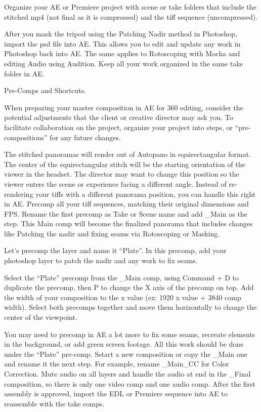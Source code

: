 \begin{fullwidth}
\clearpage
Organize your AE or Premiere project with scene or take folders that include the stitched mp4 (not final as it is compressed) and the tiff sequence (uncompressed). 


After you mask the tripod using the Patching Nadir method in Photoshop, import the psd file into AE. This allows you to edit and update any work in Photoshop back into AE. The same applies to Rotoscoping with Mocha and editing Audio using Audition. Keep all your work organized in the same take folder in AE.

\clearpage
{\large Pre-Comps and Shortcuts. \par}

When preparing your master composition in AE for 360 editing, consider the potential adjustments that the client or creative director may ask you. To facilitate collaboration on the project, organize your project into steps, or “pre-compositions” for any future changes. 

The stitched panoramas will render out of Autopano in equirectangular format. The center of the equirectangular stitch will be the starting orientation of the viewer in the headset. The director may want to change this position so the viewer enters the scene or experience facing a different angle. Instead of re-rendering your tiffs with a different panorama position, you can handle this right in AE. Precomp all your tiff sequences, matching their original dimensions and FPS. Rename the first precomp as Take or Scene name and add \_Main as the step. This Main comp will become the finalized panorama that includes changes like Patching the nadir and fixing seams via Rotoscoping or Masking. 

\clearpage
Let’s precomp the layer and name it “Plate”. In this precomp, add your photoshop layer to patch the nadir and any work to fix seams. 



Select the “Plate” precomp from the \_Main comp, using Command + D to duplicate the precomp, then P to change the X axis of the precomp on top. Add the width of your composition to the x value (ex: 1920 x value + 3840 comp width). Select both precomps together and move them horizontally to change the center of the viewpoint.
\clearpage
{}

You may need to precomp in AE a lot more to fix some seams, recreate elements in the background, or add green screen footage. All this work should be done under the “Plate” pre-comp. Sstart a new composition or copy the \_Main one and rename it the next step. For example, rename \_Main\_CC for Color Correction. Mute audio on all layers and handle the audio at end in the \_Final composition, so there is only one video comp and one audio comp. After the first assembly is approved, import the EDL or Premiere sequence into AE to reassemble with the take comps.


\end{fullwidth}
